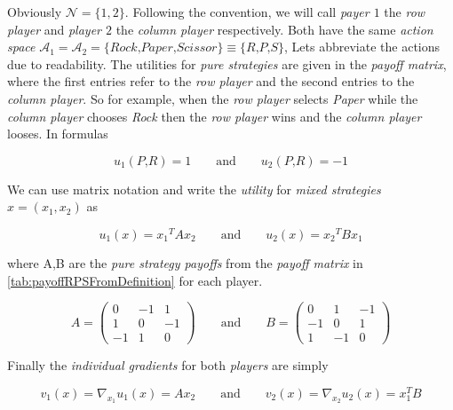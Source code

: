 Obviously $\mathcal{N} = \{1,2\}$. Following the convention, we will call \textit{payer $1$} the \textit{row player} and \textit{player $2$} the \textit{column player} respectively. Both have the same \textit{action space} $\mathcal{A}_1 = \mathcal{A}_2 = \{\textit{Rock,Paper,Scissor}\} \equiv \{\textit{R,P,S\}}$, Lets abbreviate the actions due to readability. The utilities for \textit{pure strategies} are given in the \textit{payoff matrix}, where the first entries refer to the \textit{row player} and the second entries to the \textit{column player}. So for example, when the \textit{row player} selects \textit{Paper} while the \textit{column player} chooses \textit{Rock} then the \textit{row player} wins and the \textit{column player} looses. In formulas

\begin{equation*}
    u_1(\textit{P,R}) = 1 \qquad \text{and} \qquad u_2(\textit{P,R}) = -1
\end{equation*}

We can use matrix notation and write the \textit{utility} for \textit{mixed strategies} $x = (x_1,x_2)$ as

\begin{equation*}
    u_1(x) = x{_1}^{T}Ax_2 \qquad \text{and} \qquad u_2(x) = x{_2}^{T}Bx_1
\end{equation*}

where A,B are the \textit{pure strategy payoffs} from the \textit{payoff matrix} in \ref{tab:payoffRPSFromDefinition} for each player.

\begin{equation*}
A = \begin{pmatrix}
0 & -1 & 1\\
1 & 0 & -1\\
-1 & 1 & 0
\end{pmatrix}
\qquad \text{and} \qquad
B = \begin{pmatrix}
0 & 1 & -1\\
-1 & 0 & 1\\
1 & -1 & 0
\end{pmatrix}
\end{equation*}

Finally the \textit{individual gradients} for both \textit{players} are simply

\begin{equation*}
    v_1(x) = \nabla_{x_1}u_1(x) = Ax_2 \qquad \text{and} \qquad v_2(x) = \nabla_{x_2}u_2(x) = x_{1}^{T}B
\end{equation*}

